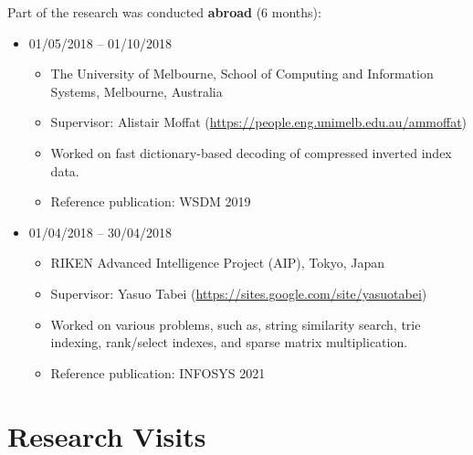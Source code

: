 \documentclass[a4paper, sans]{moderncv}
\begin{document}
{\begin{itemize}
\end{itemize}
Part of the research was conducted \textbf{abroad} (6 months):
\begin{itemize}
    \item 01/05/2018 -- 01/10/2018
        \begin{itemize}
            \item The University of Melbourne, School of Computing and Information Systems, Melbourne, Australia
            \item Supervisor: Alistair Moffat (\url{https://people.eng.unimelb.edu.au/ammoffat})
            \item Worked on fast dictionary-based decoding of compressed inverted index data.
            \item Reference publication: WSDM 2019
        \end{itemize}
    \item 01/04/2018 -- 30/04/2018
        \begin{itemize}
            \item RIKEN Advanced Intelligence Project (AIP), Tokyo, Japan
            \item Supervisor: Yasuo Tabei (\url{https://sites.google.com/site/yasuotabei})
            \item Worked on various problems, such as, string similarity search,
            trie indexing, rank/select indexes, and sparse matrix multiplication.
            \item Reference publication: INFOSYS 2021
        \end{itemize}
\end{itemize}
}

\section{Research Visits}



\end{document}
